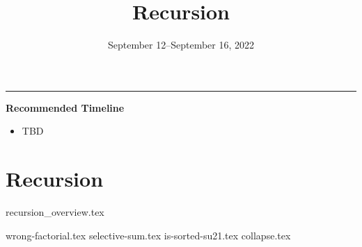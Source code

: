 \documentclass{exam}
\title{Recursion}
\date{September 12--September 16, 2022}
\begin{document}
\maketitle
\rule{\textwidth}{0.15em}
\fontsize{12}{15}\selectfont

\begin{meta}
\textbf{Recommended Timeline}
\begin{itemize}
    \item TBD
\end{itemize}
\end{meta}

\section{Recursion}
{recursion_overview.tex}
\begin{questions}
    {wrong-factorial.tex}
    {selective-sum.tex}
    {is-sorted-su21.tex}
    {collapse.tex}
\end{questions}
\end{document}

